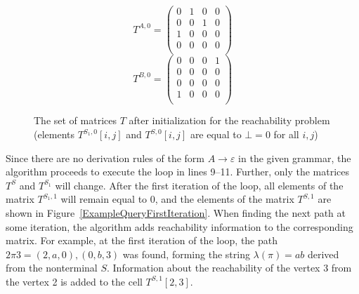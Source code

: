 \begin{figure}[h]
	\[
	T^{A, 0} = \begin{pmatrix}
	0 & 1      & 0 & 0       \\
	0 & 0 & 1       & 0 \\
	1       & 0 & 0 & 0 \\
	0       & 0 & 0 & 0 \\
	\end{pmatrix}
	\]
	\[
	T^{B, 0} = \begin{pmatrix}
	0 & 0       & 0 & 1      \\
	0 & 0 & 0       & 0 \\
	0       & 0 & 0 & 0 \\
	1      & 0 & 0 & 0 \\
	\end{pmatrix}
	\]
	\caption{The set of matrices $T$ after initialization for the reachability problem (elements $T^{S_1, 0}[i, j]$ and $T^{S, 0}[i, j]$ are equal to $\bot = 0$ for all $i, j$)}
	\label{ExampleQueryInitMatrix}
\end{figure}

Since there are no derivation rules of the form $A \rightarrow \varepsilon$ in the given grammar, the algorithm proceeds to execute the loop in lines 9--11. Further, only the matrices $T^{S}$ and $T^{S_1}$ will change. After the first iteration of the loop, all elements of the matrix $T^{S_1, 1}$ will remain equal to $0$, and the elements of the matrix $T^{S, 1}$ are shown in Figure~\ref{ExampleQueryFirstIteration}. When finding the next path at some iteration, the algorithm adds reachability information to the corresponding matrix. For example, at the first iteration of the loop, the path $2 \pi 3 = (2, a, 0), (0, b, 3)$ was found, forming the string $\lambda(\pi) = ab$ derived from the nonterminal $S$. Information about the reachability of the vertex 3 from the vertex 2 is added to the cell $T^{S, 1}[2, 3]$.


